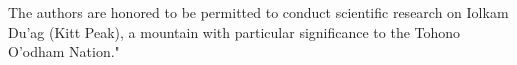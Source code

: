 The authors are honored to be permitted to conduct scientific research on Iolkam Du’ag (Kitt Peak), a mountain with particular significance to the Tohono O’odham Nation."

